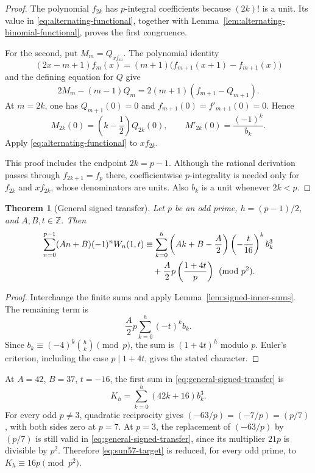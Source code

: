 \documentclass[11pt,a4paper]{article}
\numberwithin{equation}{section}
\newtheorem{theorem}{Theorem}[section]
\theoremstyle{remark}
\begin{document}
\begin{proof}
The polynomial $f_{2k}$ has $p$-integral coefficients because
$(2k)!$ is a unit. Its value in
\eqref{eq:alternating-functional}, together with
Lemma~\ref{lem:alternating-binomial-functional}, proves the first
congruence.

For the second, put $M_m=Q_{x f_m}$. The polynomial identity
\[
 (2x-m+1)f_m(x)
 =(m+1)\bigl(f_{m+1}(x+1)-f_{m+1}(x)\bigr)
\]
and the defining equation for $Q$ give
\[
 2M_m-(m-1)Q_m=2(m+1)(f_{m+1}-Q_{m+1}).
\]
At $m=2k$, one has $Q_{m+1}(0)=0$ and
$f_{m+1}(0)=f'_{m+1}(0)=0$. Hence
\[
 M_{2k}(0)=\left(k-\frac12\right)Q_{2k}(0),
 \qquad M'_{2k}(0)=\frac{(-1)^k}{b_k}.
\]
Apply \eqref{eq:alternating-functional} to $xf_{2k}$.

This proof includes the endpoint $2k=p-1$. Although the rational
derivation passes through $f_{2k+1}=f_p$ there, coefficientwise
$p$-integrality is needed only for $f_{2k}$ and $xf_{2k}$, whose
denominators are units. Also $b_k$ is a unit whenever $2k<p$.
\end{proof}

\begin{theorem}[General signed transfer]\label{thm:signed-transfer}
Let $p$ be an odd prime, $h=(p-1)/2$, and $A,B,t\in\mathbb Z$.
Then
\begin{align}
 \sum_{n=0}^{p-1}(An+B)(-1)^nW_n(1,t)
 &\equiv\sum_{k=0}^h
 \left(Ak+B-\frac A2\right)
 \left(-\frac t{16}\right)^k b_k^3\notag\\
 &\hspace{1em}+\frac A2p\left(\frac{1+4t}{p}\right)
 \pmod{p^2}.
 \label{eq:general-signed-transfer}
\end{align}
\end{theorem}

\begin{proof}
Interchange the finite sums and apply
Lemma~\ref{lem:signed-inner-sums}. The remaining term is
\[
 \frac A2p\sum_{k=0}^h(-t)^k b_k.
\]
Since $b_k\equiv(-4)^k\binom hk\pmod p$,
the sum is $(1+4t)^h$ modulo $p$. Euler's criterion, including
the case $p\mid1+4t$, gives the stated character.
\end{proof}

At $A=42$, $B=37$, $t=-16$, the first sum in
\eqref{eq:general-signed-transfer} is
\[
 K_h=\sum_{k=0}^h(42k+16)b_k^3.
\]
For every odd $p\ne3$, quadratic reciprocity gives
$(-63/p)=(-7/p)=(p/7)$, with both sides zero at $p=7$.
At $p=3$, the replacement of $(-63/p)$ by $(p/7)$ is still
valid in \eqref{eq:general-signed-transfer}, since its multiplier
$21p$ is divisible by $p^2$. Therefore
\eqref{eq:sun57-target} is reduced, for every odd prime, to
$K_h\equiv16p\pmod{p^2}$.
\end{document}

